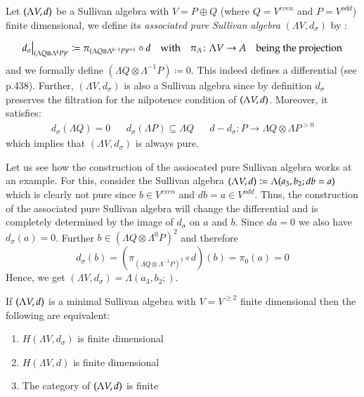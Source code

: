 \begin{Definition}
 Let $(\Lambda V,d)$ be a Sullivan algebra with $V = P \oplus Q$ (where $Q = V^{even}$ and $P = V^{odd}$)
 finite dimensional, we define its 
 \emph{associated pure Sullivan algebra} $(\Lambda V, d_{\sigma})$ by :
  
 \begin{align*}\restr{d_{\sigma}}{(\Lambda Q \otimes \Lambda^k P)^p} \coloneqq \pi_{
 (\Lambda Q \otimes \Lambda^{k-1} P)^{p+1}} \circ d 
 & &\text{with} \quad \pi_A \colon \Lambda V \to A \quad \text{being the projection} \\
 \end{align*}
 and we formally define $(\Lambda Q \otimes \Lambda^{-1} P) \coloneqq 0$. 
 This indeed defines a differential (see  \cite{Felix2001} p.438). Further, $(\Lambda V, d_{\sigma})$ 
 is also a Sullivan algebra since by definition $d_{\sigma}$ preserves the filtration for the 
 nilpotence condition of $(\Lambda V,d)$. Moreover, it satisfies:
 \begin{align*}
  d_{\sigma}(\Lambda Q) = 0 & & d_{\sigma}(\Lambda P) \subseteq \Lambda Q & & 
  d - d_{\sigma} \colon P \to \Lambda Q \otimes \Lambda P^{> 0}
 \end{align*}
  which implies that $(\Lambda V, d_{\sigma})$ is always pure.
 
 \end{Definition}

 \begin{Example}
  \label{ex:AssociatedNotMinimalSullivanAlgebra}
  Let us see how the construction of the assiocated pure Sullivan algebra works at an example. For this,
  consider the Sullivan algebra $(\Lambda V,d) \coloneqq \Lambda( a_3, b_2 ; db = a)$ which is clearly not pure since
  $b \in V^{even}$ and $db = a \in V^{odd}$. Thus, the construction of the associated pure Sullivan algebra 
  will change the differential and is completely determined by
  the image of $d_{\sigma}$ on $a$ and $b$. Since $da = 0$ we also have $d_{\sigma} (a) = 0$. Further
  $b \in (\Lambda Q \otimes \Lambda^0 P)^2$ and therefore 
  $$d_{\sigma} (b) = (\pi_{ (\Lambda Q \otimes \Lambda^{-1} P)^{3}} \circ d) (b) = \pi_0 (a) = 0$$
  Hence, we get $(\Lambda V, d_{\sigma}) = \Lambda(a_3, b_2;)$.
  \end{Example}

 
 \begin{Proposition}
\label{prop:EquivalenceFiniteDimensionCategoryCohomology}
 If $(\Lambda V,d)$ is a minimal Sullivan algebra with $V = V^{\geq 2}$ finite dimensional then the following
 are equivalent:
 
 \begin{enumerate}
  \item $H(\Lambda V, d_{\sigma})$ is finite dimensional
  \item $H(\Lambda V, d)$ is finite dimensional
  \item The category of $(\Lambda V,d)$ is finite
 \end{enumerate}

\end{Proposition}

